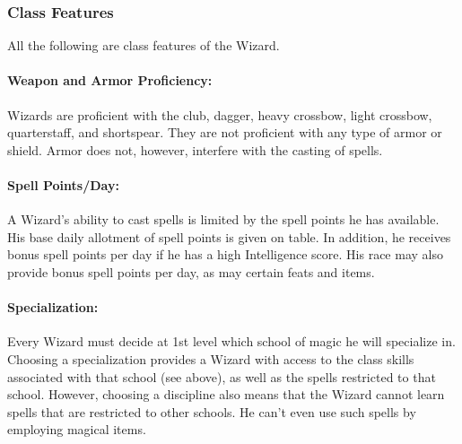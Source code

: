 \subsubsection{Class Features}
All the following are class features of the Wizard.

\paragraph{Weapon and Armor Proficiency:} Wizards are proficient with the club, dagger, heavy crossbow, light crossbow, quarterstaff, and shortspear. 
They are not proficient with any type of armor or shield. Armor does not, however, interfere with the casting of spells.

\paragraph{Spell Points/Day:} A Wizard's ability to cast spells is limited by the spell points he has available. 
His base daily allotment of spell points is given on  table. 
 In addition, he receives bonus spell points per day if he has a high Intelligence score.
% 
% 
His race may also provide bonus spell points per day, as may certain feats and items.

\paragraph{Specialization:} Every Wizard must decide at 1st level which school of magic he will specialize in. 
Choosing a specialization provides a Wizard with access to the class skills associated with that school (see above), as well as the spells restricted to that school. 
However, choosing a discipline also means that the Wizard cannot learn spells that are restricted to other schools. 
He can't even use such spells by employing magical items.

